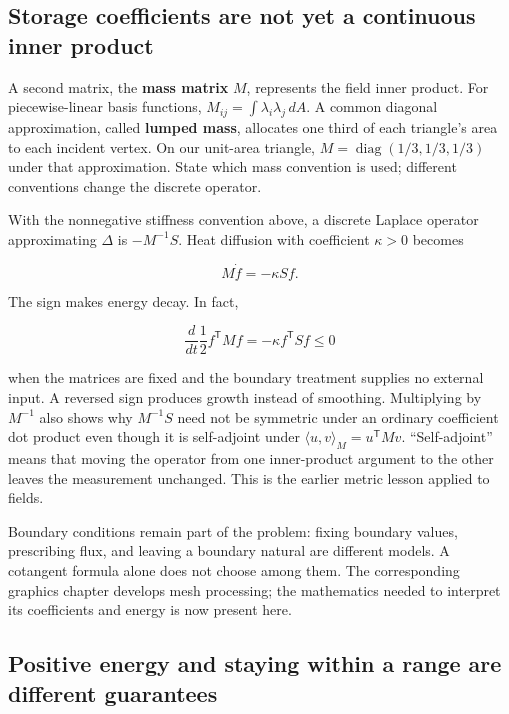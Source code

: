 \subsection{Storage coefficients are not yet a continuous inner product}\label{02-foundations-ii-ch021-storage-coefficients-are-not-yet-a-continuous-inner-product}

A second matrix, the \textbf{mass matrix} \(M\), represents the field inner product. For piecewise-linear basis functions, \(M_{ij}=\int\lambda_i\lambda_j\,dA\). A common diagonal approximation, called \textbf{lumped mass}, allocates one third of each triangle's area to each incident vertex. On our unit-area triangle, \(M=\operatorname{diag}(1/3,1/3,1/3)\) under that approximation. State which mass convention is used; different conventions change the discrete operator.

With the nonnegative stiffness convention above, a discrete Laplace operator approximating \(\Delta\) is \(-M^{-1}S\). Heat diffusion with coefficient \(\kappa>0\) becomes

\[
M\dot f=-\kappa Sf.
\]

The sign makes energy decay. In fact,

\[
\frac{d}{dt}\frac12 f^{\mathsf T}Mf
=-\kappa f^{\mathsf T}Sf\le0
\]

when the matrices are fixed and the boundary treatment supplies no external input. A reversed sign produces growth instead of smoothing. Multiplying by \(M^{-1}\) also shows why \(M^{-1}S\) need not be symmetric under an ordinary coefficient dot product even though it is self-adjoint under \(\langle u,v\rangle_M=u^{\mathsf T}Mv\). ``Self-adjoint'' means that moving the operator from one inner-product argument to the other leaves the measurement unchanged. This is the earlier metric lesson applied to fields.

Boundary conditions remain part of the problem: fixing boundary values, prescribing flux, and leaving a boundary natural are different models. A cotangent formula alone does not choose among them. The corresponding graphics chapter develops mesh processing; the mathematics needed to interpret its coefficients and energy is now present here.

\subsection{Positive energy and staying within a range are different guarantees}\label{02-foundations-ii-ch021-positive-energy-and-staying-within-a-range-are-different-guarantees}

